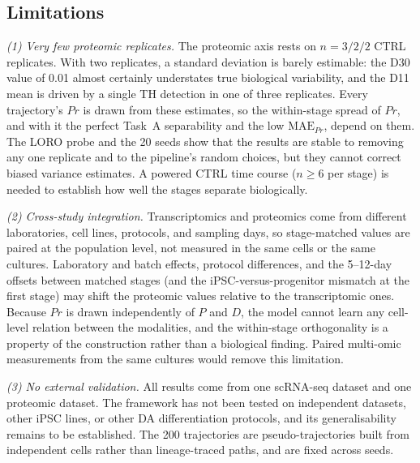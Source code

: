 \documentclass[5p,times,twocolumn]{elsarticle}
\newcommand{\rtag}[1]{}
\newenvironment{revblock}[1]{\par\rtag{#1}\ignorespaces}{\par}
\begin{document}
\subsection{\textbf{Limitations}}
\label{sec:limitations}

\begin{revblock}{R1.5,R2.8,R2.18}
  \textit{(1) Very few proteomic replicates.} The proteomic axis
  rests on $n = 3/2/2$ CTRL replicates. With two replicates, a
  standard deviation is barely estimable: the D30 value of 0.01
  almost certainly understates true biological variability, and
  the D11 mean is driven by a single TH detection in one of three
  replicates. Every trajectory's $Pr$ is drawn from these
  estimates, so the within-stage spread of $Pr$, and with it the
  perfect Task~A separability and the low $\text{MAE}_{Pr}$, depend
  on them. The LORO probe and the 20 seeds show that the results
  are stable to removing any one replicate and to the pipeline's
  random choices, but they cannot correct biased variance
  estimates. A powered CTRL time course ($n \geq 6$ per stage) is
  needed to establish how well the stages separate biologically.
\end{revblock}

\begin{revblock}{R2.17}
  \textit{(2) Cross-study integration.} Transcriptomics and
  proteomics come from different laboratories, cell lines,
  protocols, and sampling days, so stage-matched values are
  paired at the population level, not measured in the same cells
  or the same cultures. Laboratory and batch effects, protocol
  differences, and the 5--12-day offsets between matched stages
  (and the iPSC-versus-progenitor mismatch at the first stage)
  may shift the proteomic values relative to the transcriptomic
  ones. Because $Pr$ is drawn independently of $P$ and $D$, the
  model cannot learn any cell-level relation between the
  modalities, and the within-stage orthogonality is a property of
  the construction rather than a biological finding. Paired
  multi-omic measurements from the same cultures would remove
  this limitation.
\end{revblock}

\begin{revblock}{R2.19}
  \textit{(3) No external validation.} All results come from one
  scRNA-seq dataset and one proteomic dataset. The framework has
  not been tested on independent datasets, other iPSC lines, or
  other DA differentiation protocols, and its generalisability
  remains to be established. The 200 trajectories are
  pseudo-trajectories built from independent cells rather than
  lineage-traced paths, and are fixed across seeds.
\end{revblock}
\end{document}
